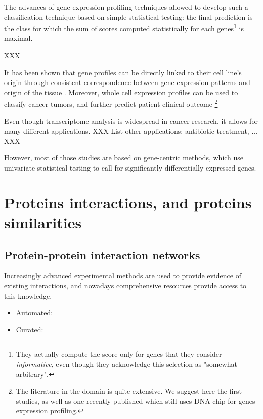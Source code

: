 	The advances of gene expression profiling techniques allowed \textcite{golub1999molecular} to develop such a classification technique based on simple statistical testing: the final prediction is the class for which the sum of scores computed statistically for each genes\footnote{They actually compute the score only for genes that they consider \emph{informative}, even though they acknowledge this selection as "somewhat arbitrary".} is maximal.

	XXX

	It has been shown that gene profiles can be directly linked to their cell line's origin through consistent correspondence between gene expression patterns and origin of the tissue \parencite{ross2000systematic}.
	Moreover, whole cell expression profiles can be used to classify cancer tumors, and further predict patient clinical outcome \parencites{perou2000molecular}{sorlie2001gene}{vantveer2002gene}{vijver2002gene}{estevez2015gene}\footnote{The literature in the domain is quite extensive. We suggest here the first studies, as well as one recently published which still uses DNA chip for genes expression profiling.}

	Even though transcriptome analysis is widespread in cancer research, it allows for many different applications. XXX List other applications: antibiotic treatment, ... XXX

	However, most of those studies are based on gene-centric methods, which use univariate statistical testing to call for significantly differentially expressed genes.

\section{Proteins interactions, and proteins similarities}

	\subsection{Protein-protein interaction networks}

	Increasingly advanced experimental methods are used to provide evidence of existing interactions, and nowadays comprehensive resources provide access to this knowledge.

	\begin{itemize}
		\item Automated: \parencite{szklarczyk2014string}
		\item Curated: \parencite{orchard2012protein}
	\end{itemize}

